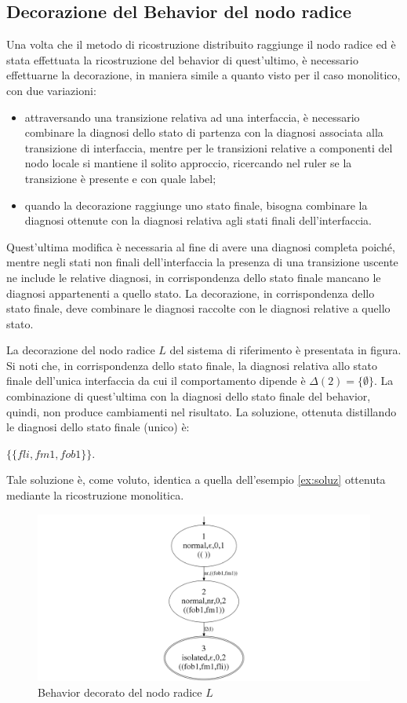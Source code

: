 \subsection{Decorazione del Behavior del nodo radice}
Una volta che il metodo di ricostruzione distribuito raggiunge il nodo radice ed è stata effettuata la ricostruzione del behavior di quest'ultimo, è necessario effettuarne la decorazione, in maniera simile a quanto visto per il caso monolitico, con due variazioni:
\begin{itemize}
\item attraversando una transizione relativa ad una interfaccia, è necessario combinare la diagnosi dello stato di partenza con la diagnosi associata alla transizione di interfaccia, mentre per le transizioni relative a componenti del nodo locale si mantiene il solito approccio, ricercando nel ruler se la transizione è presente e con quale label;
\item quando la decorazione raggiunge uno stato finale, bisogna combinare la diagnosi ottenute con la diagnosi relativa agli stati finali dell'interfaccia.
\end{itemize}
Quest'ultima modifica è necessaria al fine di avere una diagnosi completa poiché, mentre negli stati non finali dell'interfaccia la presenza di una transizione uscente ne include le relative diagnosi, in corrispondenza dello stato finale mancano le diagnosi appartenenti a quello stato. La decorazione, in corrispondenza dello stato finale, deve combinare le diagnosi raccolte con le diagnosi relative a quello stato.

\begin{ex}
La decorazione del nodo radice $L$ del sistema di riferimento è presentata in figura. Si noti che, in corrispondenza dello stato finale, la diagnosi relativa allo stato finale dell'unica interfaccia da cui il comportamento dipende è $\Delta(2) = \{\emptyset\}$. La combinazione di quest'ultima con la diagnosi dello stato finale del behavior, quindi, non produce cambiamenti nel risultato. 
La soluzione, ottenuta distillando le diagnosi dello stato finale (unico) è:
\begin{center}
 $\{\{fli,fm1,fob1\}\}$.
\end{center}
Tale soluzione è, come voluto, identica a quella dell'esempio \ref{ex:soluz} ottenuta mediante la ricostruzione monolitica.
\end{ex}

\begin{figure}[htbp]
\centering
\includegraphics[scale=0.2]{./Img/sac/bhv_l.png}
\caption{Behavior decorato del nodo radice $L$}
\label{fig:bhv_l}
\end{figure}

